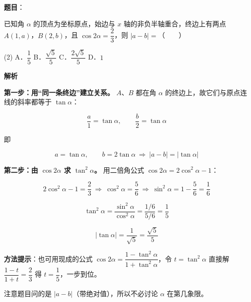 \begin{answer}

\textbf{题目}：

已知角 $\alpha$ 的顶点为坐标原点，始边与 $x$ 轴的非负半轴重合，终边上有两点 $A(1,a)$，$B(2,b)$，且 $\cos2\alpha=\dfrac23$，则 $|a-b|=$\mbox{（　　）}

\begin{gkopts}(2)
\task A．$\dfrac15$
\task B．$\dfrac{\sqrt5}5$
\task C．$\dfrac{2\sqrt5}5$
\task D．$1$
\end{gkopts}

\textbf{解析}

\textbf{第一步：用“同一条终边”建立关系。} $A$、$B$ 都在角 $\alpha$ 的终边上，故它们与原点连线的斜率都等于 $\tan\alpha$：

\nopagebreak[4]
\[\frac a1=\tan\alpha,\qquad \frac b2=\tan\alpha\]

即

\nopagebreak[4]
\[a=\tan\alpha,\qquad b=2\tan\alpha\ \Longrightarrow\ |a-b|=|\tan\alpha|\]

\textbf{第二步：由 $\cos2\alpha$ 求 $\tan^{2}\alpha$。} 用二倍角公式 $\cos2\alpha=2\cos^{2}\alpha-1$：

\nopagebreak[4]
\[2\cos^{2}\alpha-1=\frac23\ \Longrightarrow\ \cos^{2}\alpha=\frac56\ \Longrightarrow\ \sin^{2}\alpha=1-\frac56=\frac16\]

\nopagebreak[4]
\[\tan^{2}\alpha=\frac{\sin^{2}\alpha}{\cos^{2}\alpha}=\frac{1/6}{5/6}=\frac15\]

\nopagebreak[4]
\[|\tan\alpha|=\frac1{\sqrt5}=\frac{\sqrt5}5\]

\begin{gktip}
\textbf{方法提示}：也可用现成的公式 $\cos2\alpha=\dfrac{1-\tan^{2}\alpha}{1+\tan^{2}\alpha}$，令 $t=\tan^{2}\alpha$ 直接解 $\dfrac{1-t}{1+t}=\dfrac23$ 得 $t=\dfrac15$，一步到位。

注意题目问的是 $|a-b|$（带绝对值），所以不必讨论 $\alpha$ 在第几象限。
\end{gktip}


\par\medskip

\end{answer}
